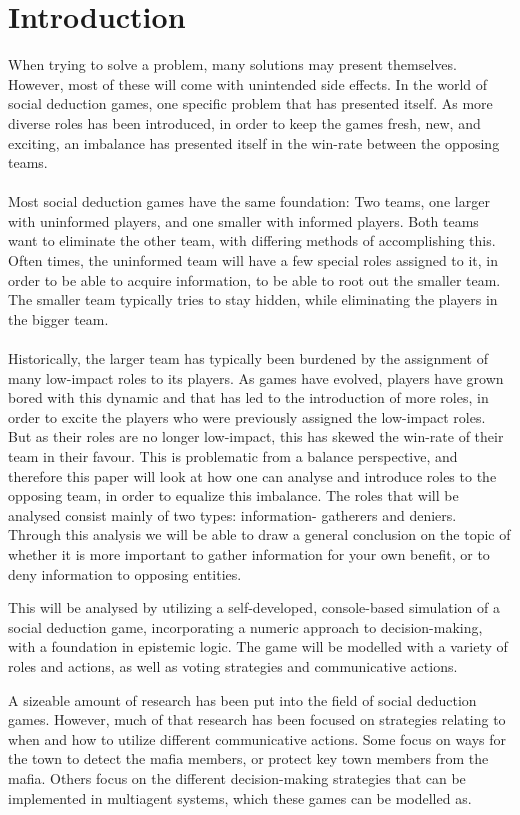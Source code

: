 \section{Introduction}
When trying to solve a problem, many solutions may present themselves. However,
most of these will come with unintended side effects. In the world of social
deduction games, one specific problem that has presented itself. As more diverse roles has been introduced, in order to keep the games
fresh, new, and exciting, an imbalance has presented itself in the win-rate
between the opposing teams. \\ \\ Most social deduction games have the same
foundation: Two teams, one larger with uninformed players, and one smaller with
informed players. Both teams want to eliminate the other team, with differing
methods of accomplishing this. Often times, the uninformed team will have a few
special roles assigned to it, in order to be able to acquire information, to be
able to root out the smaller team. The smaller team typically tries to stay
hidden, while eliminating the players in the bigger team.\\ \\ Historically,
the larger team has typically been burdened by the assignment of many
low-impact roles to its players. As games have evolved, players have grown
bored with this dynamic and that has led to the introduction of more roles, in order
to excite the players who were previously assigned the low-impact roles. But as
their roles are no longer low-impact, this has skewed the win-rate of their
team in their favour. This is problematic from a balance perspective, and
therefore this paper will look at how one can analyse and introduce roles to
the opposing team, in order to equalize this imbalance. The roles that will be
analysed consist mainly of two types: information- gatherers and deniers. Through this analysis we will be able to draw a general conclusion on
the topic of whether it is more important to gather information for your own
benefit, or to deny information to opposing entities.

This will be analysed by utilizing a self-developed, console-based simulation
of a social deduction game, incorporating a numeric approach to decision-making, with a
foundation in epistemic logic. The game will be modelled with a variety of
roles and actions, as well as voting strategies and communicative actions.

A sizeable amount of research has been put into the field of social deduction
games. However, much of that research has been focused on strategies relating
to when and how to utilize different communicative actions\cite{commitment}.
Some focus on ways for the town to detect the mafia
members\cite{werewolf_stealth}, or protect key town members from the
mafia\cite{werewolf_nash_equilibrium}. Others focus on the different
decision-making strategies that can be implemented in multiagent systems, which
these games can be modelled
as\cite{modelling_multi_agent_epistemic_systems}\cite{multi_agent_epistemic_planner_common_knowledge}\cite{probibalistic_multiagent_systems}.

